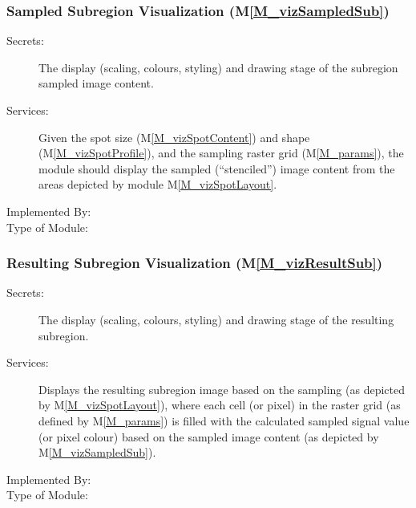 \documentclass[12pt, titlepage]{article}
\newcommand{\mref}[1]{M\ref{#1}}
\begin{document}
\subsubsection{Sampled Subregion Visualization (\mref{M_vizSampledSub})}
\begin{description}
\item[Secrets:]The display (scaling, colours, styling) and drawing stage 
  of the subregion sampled image content.
\item[Services:]Given the spot size (\mref{M_vizSpotContent}) and
  shape (\mref{M_vizSpotProfile}), and the sampling raster grid (\mref{M_params}),
  the module should display the sampled (``stenciled'') image content from the areas
  depicted by module \mref{M_vizSpotLayout}.
\item[Implemented By:] \progname{}
\item[Type of Module:] 
\end{description}


\subsubsection{Resulting Subregion Visualization (\mref{M_vizResultSub})}
\begin{description}
\item[Secrets:]The display (scaling, colours, styling) and drawing stage 
  of the resulting subregion.
\item[Services:]Displays the resulting subregion image based on the sampling
  (as depicted by \mref{M_vizSpotLayout}),
  where each cell (or pixel) in the raster grid (as defined by \mref{M_params})
  is filled with the calculated sampled signal value (or pixel colour) based
  on the sampled image content (as depicted by \mref{M_vizSampledSub}).
\item[Implemented By:] \progname{}
\item[Type of Module:] 
\end{description}
\end{document}
